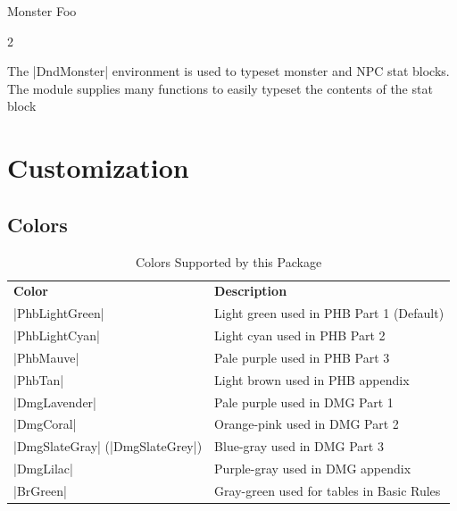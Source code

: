 \documentclass[letterpaper,twocolumn,openany,nodeprecatedcode]{dndbook}
\begin{document}
\begin{DndMonster}[float*=b,width=\textwidth + 8pt]{Monster Foo}
\begin{multicols}{2}
    \begin{DndMonsterLegendaryActions}
    \end{DndMonsterLegendaryActions}
  \end{multicols}
\end{DndMonster}

The |DndMonster| environment is used to typeset monster and NPC stat blocks. The module supplies many functions to easily typeset the contents of the stat block

\part{Customization}

\chapter{Colors}

\begin{table}[b]
  \caption{\DndFontTableTitle{}Colors Supported by this Package}\label{tab:colors}

  \begin{tabularx}{\linewidth}{lX}
    \textbf{Color}                  & \textbf{Description} \\
    \rowcolor{PhbLightGreen}
    |PhbLightGreen|                 & Light green used in PHB Part 1 (Default) \\
    \rowcolor{PhbLightCyan}
    |PhbLightCyan|                  & Light cyan used in PHB Part 2 \\
    \rowcolor{PhbMauve}
    |PhbMauve|                      & Pale purple used in PHB Part 3 \\
    \rowcolor{PhbTan}
    |PhbTan|                        & Light brown used in PHB appendix \\
    \rowcolor{DmgLavender}
    |DmgLavender|                   & Pale purple used in DMG Part 1 \\
    \rowcolor{DmgCoral}
    |DmgCoral|                      & Orange-pink used in DMG Part 2 \\
    \rowcolor{DmgSlateGray}
    |DmgSlateGray| (|DmgSlateGrey|) & Blue-gray used in DMG Part 3 \\
    \rowcolor{DmgLilac}
    |DmgLilac|                      & Purple-gray used in DMG appendix \\
    \rowcolor{BrGreen}
    |BrGreen|                       & Gray-green used for tables in Basic Rules\\
  \end{tabularx}
\end{table}
\end{document}
